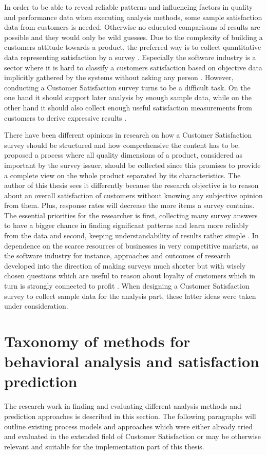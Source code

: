 In order to be able to reveal reliable patterns and influencing factors in quality and performance data when executing analysis methods, some sample satisfaction data from customers is needed. Otherwise no educated comparisons of results are possible and they would only be wild guesses. Due to the complexity of building a customers attitude towards a product, the preferred way is to collect quantitative data representing satisfaction by a survey \cite{yuksel1998customer} \cite{hayes1998measuring}. Especially the software industry is a sector where it is hard to classify a customers satisfaction based on objective data implicitly gathered by the systems without asking any person \cite{hayes1998measuring}. However, conducting a Customer Satisfaction survey turns to be a difficult task. On the one hand it should support later analysis by enough sample data, while on the other hand it should also collect enough useful satisfaction measurements from customers to derive expressive results \cite{sauermann2013increasing}. 

There have been different opinions in research on how a Customer Satisfaction survey should be structured and how comprehensive the content has to be. \cite{hayes1998measuring} proposed a process where all quality dimensions of a product, considered as important by the survey issuer, should be collected since this promises to provide a complete view on the whole product separated by its characteristics. The author of this thesis sees it differently because the research objective is to reason about an overall satisfaction of customers without knowing any subjective opinion from them. Plus, response rates will decrease the more items a survey contains. The essential priorities for the researcher is first, collecting many survey answers to have a bigger chance in finding significant patterns and learn more reliably from the data and second, keeping understandability of results rather simple \cite{sauermann2013increasing}. In dependence on the scarce resources of businesses in very competitive markets, as the software industry for instance, approaches and outcomes of research developed into the direction of making surveys much shorter but with wisely chosen questions which are useful to reason about loyalty of customers which in turn is strongly connected to profit \cite{reichheld2003one}. When designing a Customer Satisfaction survey to collect sample data for the analysis part, these latter ideas were taken under consideration. 

\section{Taxonomy of methods for behavioral analysis and satisfaction prediction}
The research work in finding and evaluating different analysis methods and prediction approaches is described in this section. The following paragraphs will outline existing process models and approaches which were either already tried and evaluated in the extended field of Customer Satisfaction or may be otherwise relevant and suitable for the implementation part of this thesis. 

